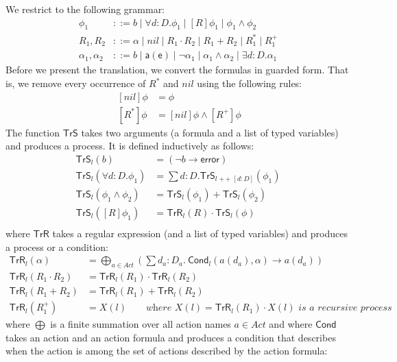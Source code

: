 \documentclass[letter]{llncs}
\newcommand{\Tr}{\ensuremath{\mathsf{TrS}}}
\newcommand{\TrR}{\ensuremath{\mathsf{TrR}}}
\newcommand{\TrA}{\ensuremath{\mathsf{Cond}}}
\renewcommand{\a}[1]{\ensuremath{\mathsf{#1}}}
\newcommand{\concat}{\ensuremath{\mathop{+\!\!+}}}
\begin{document}
We restrict to the following grammar:
\[
\begin{array}{ll}
\phi_1 & ::= b \mid \forall d:D.\phi_1 \mid [R]\phi_1 \mid \phi_1\wedge \phi_2\\
R_1,R_2 & ::= \alpha \mid nil \mid R_1\cdot R_2 \mid
              R_1+R_2 \mid
              R_1^* \mid R_1^+ \\
\alpha_1,\alpha_2 & ::= b \mid \a{a(e)} \mid \neg \alpha_1 \mid
              \alpha_1 \wedge \alpha_2 \mid
              \exists d:D.\alpha_1
\end{array}
\]
Before we present the translation, we convert the formulas in
guarded form. That is, we remove every occurrence of $R^*$ and $nil$ using
the following rules:
\[
\begin{array}{ll}
~
[nil]\phi &= \phi \\
~[R^*]\phi &= [nil]\phi \wedge [R^+]\phi
\end{array}
\]
The function $\Tr$ takes two arguments (a formula and a list of typed
variables) and produces a process. It is defined inductively as follows:
\[
\begin{array}{ll}
\Tr_l(b) &= (\neg b \to \a{error}) \\
\Tr_l(\forall d:D.\phi_1) & = \sum d:D. \Tr_{l\concat [d:D]} (\phi_1) \\
\Tr_l(\phi_1 \wedge \phi_2) & = \Tr_l(\phi_1) + \Tr_l(\phi_2) \\
\Tr_l([R]\phi_1) & = \TrR_l(R) \cdot \Tr_l(\phi) \\
\end{array}
\]
where $\TrR$ takes a regular expression (and a list of typed variables)
and produces a process or a condition:
\[
\begin{array}{ll}
\TrR_l(\alpha) &= \bigoplus\limits_{a \in Act} (\sum d_a:D_a.~ \TrA_l(a(d_a),\alpha) \to a(d_a)) \\
\TrR_l(R_1 \cdot R_2) & = \TrR_l(R_1) \cdot \TrR_l(R_2) \\
\TrR_l(R_1 + R_2) &= \TrR_l(R_1) + \TrR_l(R_2) \\
\TrR_l(R_1^+) & = X(l) \qquad \textit{where $X(l) = \TrR_l(R_1)\cdot X(l)$ is
a recursive process} 
\end{array}
\]
where $\bigoplus$ is a finite summation over all action names
$a \in Act$ and
where $\TrA$ takes an action and an action formula and produces a condition
that describes when the action is among the set of actions described by
the action formula:
\end{document}
